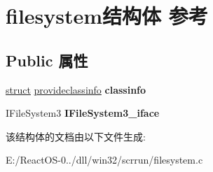 \hypertarget{structfilesystem}{}\section{filesystem结构体 参考}
\label{structfilesystem}
\subsection*{Public 属性}
\begin{DoxyCompactItemize}
\item 
\mbox{\label{structfilesystem_ad49598c72782bd00bd6bde47a9127090}} 
\hyperlink{interfacestruct}{struct} \hyperlink{structprovideclassinfo}{provideclassinfo} {\bfseries classinfo}
\item 
\mbox{\label{structfilesystem_a16b38aa98c25d30f52887ab63339879a}} 
I\+File\+System3 {\bfseries I\+File\+System3\+\_\+iface}
\end{DoxyCompactItemize}


该结构体的文档由以下文件生成\+:\begin{DoxyCompactItemize}
\item 
E\+:/\+React\+O\+S-\/0../dll/win32/scrrun/filesystem.\+c\end{DoxyCompactItemize}
